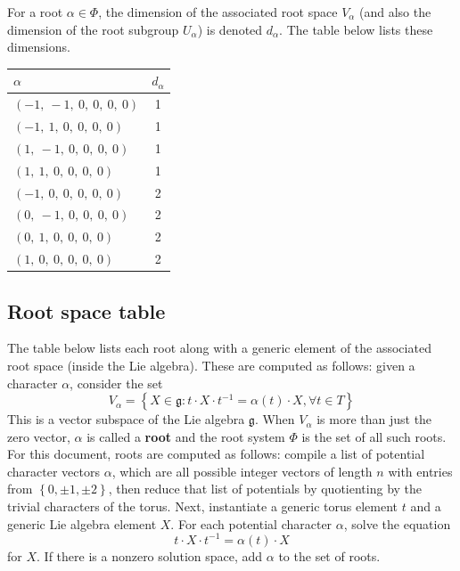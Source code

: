\documentclass[11pt]{article}
\newcommand{\noi}{\noindent}
\newcommand{\tbf}{\textbf}
\newcommand{\inv}{^{-1}}
\newcommand{\lb}{\left\{}
\newcommand{\rb}{\right\}}
\newcommand{\frakg}{\mathfrak{g}}
\theoremstyle{definition}
\begin{document}
For a root $\alpha \in \Phi$, the dimension of the associated root space $V_\alpha$ (and also the dimension of the root subgroup $U_\alpha$) is denoted $d_\alpha$. The table below lists these dimensions.

\bigskip

\noindent \begin{tabular}{|l|c|}
    \hline
    \textbf{$\alpha$} & \textbf{$d_{\alpha}$} \\
    \hline
    $\left( -1, \  -1, \  0, \  0, \  0, \  0\right)$ & 1 \\
    \hline
    $\left( -1, \  1, \  0, \  0, \  0, \  0\right)$ & 1 \\
    \hline
    $\left( 1, \  -1, \  0, \  0, \  0, \  0\right)$ & 1 \\
    \hline
    $\left( 1, \  1, \  0, \  0, \  0, \  0\right)$ & 1 \\
    \hline
    $\left( -1, \  0, \  0, \  0, \  0, \  0\right)$ & 2 \\
    \hline
    $\left( 0, \  -1, \  0, \  0, \  0, \  0\right)$ & 2 \\
    \hline
    $\left( 0, \  1, \  0, \  0, \  0, \  0\right)$ & 2 \\
    \hline
    $\left( 1, \  0, \  0, \  0, \  0, \  0\right)$ & 2 \\
    \hline
\end{tabular}


\subsection{Root space table}

\noi The table below lists each root along with a generic element of the associated root space (inside the Lie algebra). These are computed as follows: given a character $\alpha$, consider the set
\[
	V_\alpha = \lb X \in \frakg : t \cdot X \cdot t \inv = \alpha(t) \cdot X, \forall t \in T \rb
\]
This is a vector subspace of the Lie algebra $\frakg$. When $V_\alpha$ is more than just the zero vector, $\alpha$ is called a \tbf{root} and the root system $\Phi$ is the set of all such roots. For this document, roots are computed as follows: compile a list of potential character vectors $\alpha$, which are all possible integer vectors of length $n$ with entries from $\lb 0, \pm 1, \pm 2 \rb$, then reduce that list of potentials by quotienting by the trivial characters of the torus. Next, instantiate a generic torus element $t$ and a generic Lie algebra element $X$. For each potential character $\alpha$, solve the equation
\[
	t \cdot X \cdot t \inv = \alpha(t) \cdot X
\]
for $X$. If there is a nonzero solution space, add $\alpha$ to the set of roots.
\end{document}
